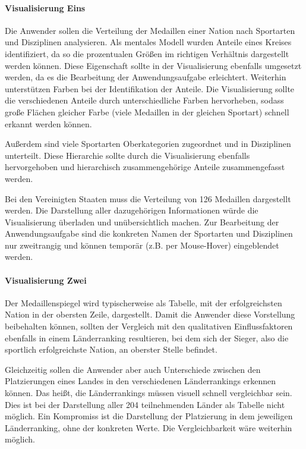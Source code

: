 \paragraph{Visualisierung Eins}
Die Anwender sollen die Verteilung der Medaillen einer Nation nach Sportarten und Disziplinen analysieren. Als mentales Modell wurden Anteile eines Kreises identifiziert, da so die prozentualen Größen im richtigen Verhältnis dargestellt werden können. Diese Eigenschaft sollte in der Visualisierung ebenfalls umgesetzt werden, da es die Bearbeitung der Anwendungsaufgabe erleichtert. Weiterhin unterstützen Farben bei der Identifikation der Anteile. Die Visualisierung sollte die verschiedenen Anteile durch unterschiedliche Farben hervorheben, sodass große Flächen gleicher Farbe (viele Medaillen in der gleichen Sportart) schnell erkannt werden können.

Außerdem sind viele Sportarten Oberkategorien zugeordnet und in Disziplinen unterteilt. Diese Hierarchie sollte durch die Visualisierung ebenfalls hervorgehoben und hierarchisch zusammengehörige Anteile zusammengefasst werden.

Bei den Vereinigten Staaten muss die Verteilung von 126 Medaillen dargestellt werden. Die Darstellung aller dazugehörigen Informationen würde die Visualisierung überladen und unübersichtlich machen. Zur Bearbeitung der Anwendungsaufgabe sind die konkreten Namen der Sportarten und Disziplinen nur zweitrangig und können temporär (z.B. per Mouse-Hover) eingeblendet werden. 

\paragraph{Visualisierung Zwei}
Der Medaillenspiegel wird typischerweise als Tabelle, mit der erfolgreichsten Nation in der obersten Zeile, dargestellt. Damit die Anwender diese Vorstellung beibehalten können, sollten der Vergleich mit den qualitativen Einflussfaktoren ebenfalls in einem Länderranking resultieren, bei dem sich der Sieger, also die sportlich erfolgreichste Nation, an oberster Stelle befindet. 

Gleichzeitig sollen die Anwender aber auch Unterschiede zwischen den Platzierungen eines Landes in den verschiedenen Länderrankings erkennen können. Das heißt, die Länderrankings müssen visuell schnell vergleichbar sein. Dies ist bei der Darstellung aller 204 teilnehmenden Länder als Tabelle nicht möglich. Ein Kompromiss ist die Darstellung der Platzierung in dem jeweiligen Länderranking, ohne der konkreten Werte. Die Vergleichbarkeit wäre weiterhin möglich. 

